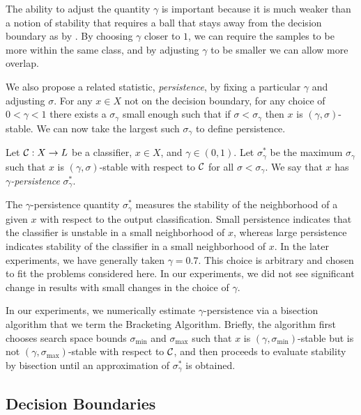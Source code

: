 The ability to adjust the quantity $\gamma$ is important because it is much weaker than a notion of stability that requires a ball that stays away from the decision boundary as by \citet{khoury2018}. By choosing $\gamma$ closer to $1$, we can require the samples to be more within the same class, and by adjusting $\gamma$ to be smaller we can allow more overlap.

We also propose a related statistic, \emph{persistence}, by fixing a particular $\gamma$ and adjusting $\sigma$. For any $x\in X$ not on the decision boundary, for any choice of $0<\gamma<1$ there exists a $\sigma_\gamma$ small enough such that if $\sigma < \sigma_\gamma$ then $x$ is $(\gamma,\sigma)$-stable. We can now take the largest such $\sigma_\gamma$ to define persistence.

\begin{definition}
    Let $\mathcal{C}:X\to L$ be a classifier, $x \in X$, and $\gamma\in(0,1)$. Let $\sigma_\gamma^*$ be the maximum $\sigma_\gamma$ such that $x$ is $(\gamma, \sigma)$-stable with respect to $\mathcal{C}$ for all $\sigma<\sigma_\gamma$. We say that $x$ has \emph{$\gamma$-persistence} $\sigma_\gamma^*$.
\end{definition}

The $\gamma$-persistence quantity $\sigma_\gamma^*$ measures the stability of the neighborhood of a given $x$ with respect to the output classification. Small persistence indicates that the classifier is unstable in a small neighborhood of $x$, whereas large persistence indicates stability of the classifier in a small neighborhood of $x$. In the later experiments, we have generally taken $\gamma = 0.7$. This choice is arbitrary and chosen to fit the problems considered here. In our experiments, we did not see significant change in results with small changes in the choice of $\gamma$.

In our experiments, we numerically estimate $\gamma$-persistence via a bisection algorithm that we term the Bracketing Algorithm.  Briefly, the algorithm first chooses search space bounds $\sigma_{\min}$ and $\sigma_{\max}$ such that $x$ is  $(\gamma,\sigma_{\min})$-stable but is not $(\gamma,\sigma_{\max})$-stable with respect to $\mathcal{C}$, and then proceeds to evaluate stability by bisection until an approximation of $\sigma_\gamma^*$ is obtained.

\subsection{Decision Boundaries} \label{subsec:db}


